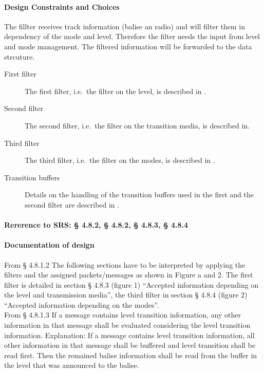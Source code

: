\documentclass{template/openetcs_report}
\begin{document}
\paragraph{Design Constraints and Choices}
The fillter receives track information (balise an radio) and will filter them in dependency of the mode and level.
Therefore the filter needs the input from level and mode management. The filtered information will be forwarded to the data strcuture.

\begin{description}
\item[First filter] The first filter, i.e.~the filter on the level, is described in \cite[Chapter~4.8.3]{subset-026}.
\item[Second filter] The second filter, i.e.~the filter on the transition media, is described in\cite[Chapter~4.8.3]{subset-026}.
\item[Third filter]
 The third filter, i.e.~the filter on the modes, is described in \cite[Chapter~4.8.4]{subset-026}.
\item[Transition buffers] Details on the handling of the transition buffers used in the first and the second filter are described in \cite[Chapter~4.8.5]{subset-026}.
\end{description}


\paragraph{Rererence to SRS: § 4.8.2, § 4.8.2, § 4.8.3, § 4.8.4}

\paragraph{Documentation of design}
From § 4.8.1.2 The following sections have to be interpreted by applying the filters and the assigned packets/messages as shown in Figure a and 2. The first filter is detailed in section § 4.8.3 (figure 1) “Accepted information depending on the level and transmission media”, the third filter in section § 4.8.4 (figure 2) “Accepted information depending on the modes”.\\

From § 4.8.1.3 If a message contains level transition information, any other information in that message shall be evaluated considering the level transition information. Explanation: If a message contains level transition information, all other information in that message shall be buffered and level transition shall be read first. Then the remained balise information shall be read from the buffer in the level that was announced to the balise.\\
\end{document}
